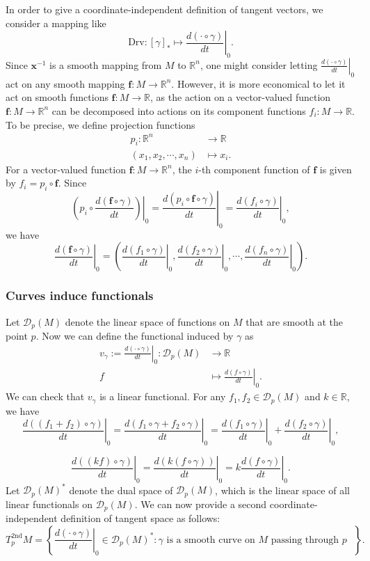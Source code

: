 \documentclass{report}
\begin{document}
In order to give a coordinate-independent definition of tangent vectors, we consider a mapping like
\[
    \mathrm{Drv}:[\gamma]_*\longmapsto\left.\frac{d(\cdot \circ \gamma)}{dt}\right|_0.
\]
Since $\mathbf{x}^{-1}$ is a smooth mapping from $M$ to $\mathbb{R}^n$, one might consider letting $\left. \frac{d(\cdot \circ \gamma)}{dt} \right|_0$ act on any smooth mapping $\mathbf{f}:M\to\mathbb{R}^n$. However, it is more economical to let it act on smooth functions $\mathbf{f}:M\to\mathbb{R}$, as the action on a vector-valued function $\mathbf{f}:M\to\mathbb{R}^n$ can be decomposed into actions on its component functions $f_i:M\to\mathbb{R}$. To be precise, we define projection functions
\[
\begin{aligned}
    p_i:\mathbb{R}^n&\longrightarrow \mathbb{R}\\
    (x_1,x_2,\cdots,x_n)&\longmapsto x_i.
\end{aligned}
\]
For a vector-valued function $\mathbf{f} : M \to \mathbb{R}^n$, the $i$-th component function of $\mathbf{f}$ is given by $f_i = p_i \circ \mathbf{f}$. Since
\[
    \left(p_i\circ\left.\frac{d(\mathbf{f} \circ \gamma)}{dt}\right)\right|_0=\left.\frac{d(p_i\circ\mathbf{f} \circ \gamma)}{dt}\right|_0=\left.\frac{d(f_i \circ \gamma)}{dt}\right|_0,
\]
we have
\[
    \left.\frac{d(\mathbf{f} \circ \gamma)}{dt}\right|_0=\left(\left.\frac{d(f_1 \circ \gamma)}{dt}\right|_0,\left.\frac{d(f_2 \circ \gamma)}{dt}\right|_0,\cdots,\left.\frac{d(f_n \circ \gamma)}{dt}\right|_0\right).
\]
\subsubsection{Curves induce functionals}
Let $\mathcal{D}_p(M)$ denote the linear space of functions on $M$ that are smooth at the point $p$. Now we can define the functional induced by $\gamma$ as 
\[
\begin{aligned}
    v_\gamma:=\left.\frac{d(\cdot \circ
\gamma)}{dt}\right|_0:\mathcal{D}_p(M)&\longrightarrow \mathbb{R}\\
    f&\longmapsto \left.\frac{d(f \circ \gamma)}{dt}\right|_0.
\end{aligned}
\]
We can check that $v_\gamma$ is a linear functional. For any $f_1,f_2\in\mathcal{D}_p(M)$ and $k\in\mathbb{R}$, we have
$$
\left.\frac{d((f_1+f_2) \circ \gamma)}{dt}\right|_0=\left.\frac{d(f_1\circ \gamma+f_2\circ \gamma )}{dt}\right|_0=\left.\frac{d(f_1\circ \gamma)}{dt}\right|_0+\left.\frac{d(f_2\circ \gamma)}{dt}\right|_0,
$$

$$
\left.\frac{d((kf) \circ \gamma)}{dt}\right|_0=\left.\frac{d(k(f \circ \gamma))}{dt}\right|_0=k\left.\frac{d(f \circ \gamma)}{dt}\right|_0.
$$
Let $\mathcal{D}_p(M)^*$ denote the dual space of $\mathcal{D}_p(M)$, which is the linear space of all linear functionals on $\mathcal{D}_p(M)$. We can now provide a second coordinate-independent definition of tangent space as follows:
$$
T^{2\mathrm{nd}}_pM=\left\{\left.\frac{d(\cdot \circ \gamma)}{dt}\right|_0\in\mathcal{D}_p(M)^*:\gamma\text{ is a smooth curve on $M$ passing through $p$ }\right\}.
$$
\end{document}

